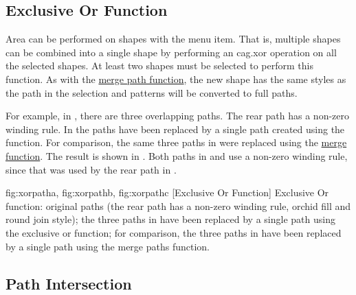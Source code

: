 \subsection{Exclusive Or Function}\label{sec:xorpath}


Area  can be performed on \glspl{shape} with
the  menu item. That is, multiple \glspl{shape}
can be combined into a single \gls*{shape} by performing an
\gls{cag.xor} operation on all the selected \glspl*{shape}.  At
least two \glspl*{shape} must be selected to perform this function.
As with the \hyperref[sec:mergepaths]{merge path function}, the new
\gls*{shape} has the same styles as the 
path in the selection and \glspl{pattern} will be converted to full
\glspl{path}.

For example, in , there are three
overlapping paths.  The rear path has a non-zero winding rule. In
 the paths have been replaced by a
single path created using the  function. For comparison,
the same three paths in  were replaced
using the \hyperref[sec:mergepaths]{merge function}. The result is
shown in . Both paths in
 and  use
a non-zero winding rule, since that was used by the rear path in
.

{
 {fig:xorpatha}{}{},
 {fig:xorpathb}{}{},
 {fig:xorpathc}{}{}
}
[Exclusive Or Function]
{Exclusive Or function: 
 original paths (the rear path has 
a non-zero winding rule, orchid
fill  and round join style);
 the three paths in
 have been replaced by 
a single path using the exclusive or function; 
 for comparison, the three paths in
 have been replaced by 
a single path using the merge paths function.}


\subsection{Path Intersection}\label{sec:pathintersect}

